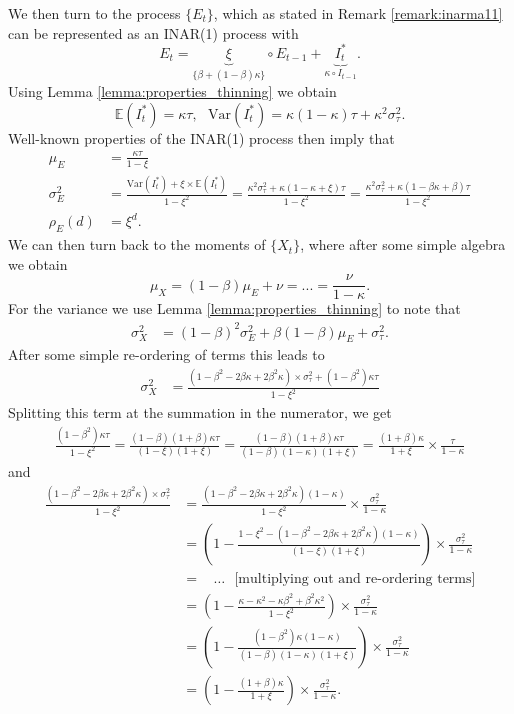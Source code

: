 \documentclass{article}
\begin{document}
We then turn to the process $\{E_t\}$, which as stated in Remark \ref{remark:inarma11} can be represented as an INAR(1) process with
$$
E_t = \underbrace{\xi}_{\{\beta + (1 - \beta)\kappa\}} \circ E_{t - 1} + \underbrace{I^*_t}_{\kappa \circ I_{t - 1}}.
$$
Using Lemma \ref{lemma:properties_thinning} we obtain
$$
\mathbb{E}(I^*_t) = \kappa \tau, \ \ \ \text{Var}(I^*_t) = \kappa(1 - \kappa)\tau + \kappa^2 \sigma^2_\tau.
$$
Well-known properties of the INAR(1) process then imply that
\begin{align*}
\mu_E & = \frac{\kappa\tau}{1 - \xi}\\
\sigma^2_E & = \frac{\text{Var}(I^*_t) + \xi \times \mathbb{E}(I^*_t)}{1 - \xi^2} = \frac{\kappa^2\sigma^2_\tau + \kappa(1 - \kappa + \xi)\tau}{1 - \xi^2} = \frac{\kappa^2\sigma^2_\tau + \kappa(1 - \beta\kappa + \beta)\tau}{1 - \xi^2}\\
\rho_E(d) & = \xi^d.
\end{align*}
We can then turn back to the moments of $\{X_t\}$, where after some simple algebra we obtain
$$
\mu_X = (1 - \beta)\mu_E + \nu = ... = \frac{\nu}{1 - \kappa}.
$$
For the variance we use Lemma \ref{lemma:properties_thinning} to note that
\begin{align*}
\sigma^2_X & = (1 - \beta)^2 \sigma^2_E + \beta(1 - \beta)\mu_E + \sigma^2_\tau.
\end{align*}
After some simple re-ordering of terms this leads to
\begin{align}
\sigma^2_X & = \frac{(1 - \beta^2 - 2\beta\kappa + 2\beta^2\kappa)\times \sigma^2_\tau + (1 - \beta^2)\kappa\tau}{1 - \xi^2}\label{eq:sigma2_X_intermediate}
\end{align}
Splitting this term at the summation in the numerator, we get
\begin{align*}
\frac{(1 - \beta^2)\kappa\tau}{1 - \xi^2} = \frac{(1 - \beta)(1 + \beta)\kappa\tau}{(1 - \xi)(1 + \xi)} = \frac{(1 - \beta)(1 + \beta)\kappa\tau}{(1 - \beta)(1 - \kappa)(1 + \xi)} = \frac{(1 + \beta)\kappa}{1 + \xi} \times \frac{\tau}{1 - \kappa}
\end{align*}
and
\begin{align*}
\frac{(1 - \beta^2 - 2\beta\kappa + 2\beta^2\kappa)\times \sigma^2_\tau}{1 - \xi^2} & = \frac{(1 - \beta^2 - 2\beta\kappa + 2\beta^2\kappa)(1 - \kappa)}{1 - \xi^2} \times \frac{\sigma^2_\tau}{1 - \kappa}\\
& = \left(1 - \frac{1 - \xi^2 - (1 - \beta^2 - 2\beta\kappa + 2\beta^2\kappa)(1 - \kappa)}{(1 - \xi)(1 + \xi)}\right) \times \frac{\sigma^2_\tau}{1 - \kappa}\\
& = \ \ \ \ \dots \ \ \ \text{[multiplying out and re-ordering terms]}\\
& = \left(1 - \frac{\kappa - \kappa^2 - \kappa\beta^2 + \beta^2\kappa^2}{1 - \xi^2}\right) \times \frac{\sigma^2_\tau}{1 - \kappa}\\
& = \left(1 - \frac{(1 - \beta^2)\kappa(1 - \kappa)}{(1 - \beta)(1 - \kappa)(1 + \xi)}\right) \times \frac{\sigma^2_\tau}{1 - \kappa}\\
& = \left(1 - \frac{(1 + \beta)\kappa}{1 + \xi}\right) \times \frac{\sigma^2_\tau}{1 - \kappa}.
\end{align*}
\end{document}
